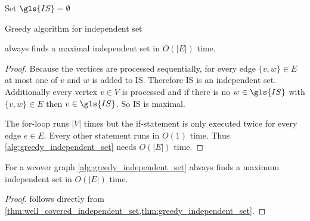 

\begin{algorithm}
  \DontPrintSemicolon
  
  
  Set \(\gls{IS} = \emptyset\) \;
  \caption{\label{alg:greedy_independent_set}Greedy algorithm for independent set}
\end{algorithm}


\begin{theorem}
  \label{thm:greedy_independent_set}
   always finds a maximal independent
  set in \(O(|E|)\) time.
\end{theorem}

\begin{proof}
  Because the vertices are processed sequentially, for every edge
  \(\{v,w\} \in E\) at most one of \(v\) and \(w\) is added to
  \gls{IS}. Therefore \gls{IS} is an independent set. Additionally 
  every vertex \(v \in V\) is processed and if there is no
  \(w \in \gls{IS}\) with \(\{v,w\} \in E\) then \(v \in \gls{IS}\).
  So \gls{IS} is maximal.
  
  The for-loop runs \(|V|\) times but the if-statement is only
  executed twice for every edge \(e \in E\). Every other statement
  runs in \(O(1)\) time. Thus \cref{alg:greedy_independent_set} needs
  \(O(|E|)\) time.
\end{proof}


\begin{theorem}
  \label{thm:well_covered_maximum_independent_set}
  For a \gls{wcover} graph \cref{alg:greedy_independent_set} always
  finds a maximum independent set in \(O(|E|)\) time.
\end{theorem}

\begin{proof}
   follows directly
  from \cref{thm:well_covered_independent_set,thm:greedy_independent_set}.
\end{proof}

